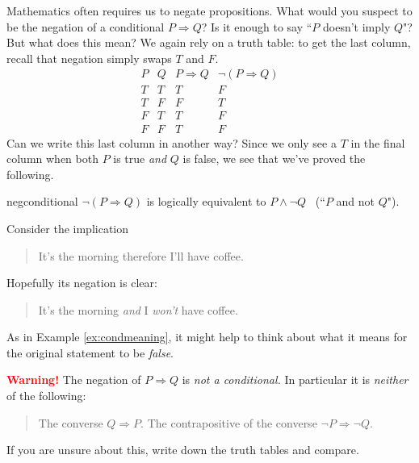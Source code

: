  

Mathematics often requires us to negate propositions. What would you suspect to be the negation of a conditional $P\Longrightarrow Q$? Is it enough to say ``$P$ doesn't imply $Q$"? But what does this mean? We again rely on a truth table: to get the last column, recall that negation simply swaps $T$ and $F$.
\[
	\begin{array}{cc|c|c}
		P & Q & P\Longrightarrow Q & \neg(P\Longrightarrow Q)\\\hline
		T & T & T & F\\
		T & F & F & T\\
		F & T & T & F\\
		F & F & T & F
	\end{array}
\]
Can we write this last column in another way? Since we only see a $T$ in the final column when both $P$ is true \emph{and} $Q$ is false, we see that we've proved the following.

\begin{thm}{}{negconditional}
	$\neg(P\Longrightarrow Q)$ is logically equivalent to $P\wedge\neg Q$ \ (``$P$ and not $Q$").
\end{thm}


\begin{example}{}{}
	Consider the implication
	\begin{quote}
	  It's the morning therefore I'll have coffee.
	\end{quote}
	Hopefully its negation is clear:
	\begin{quote}
	  It's the morning \emph{and} I \emph{won't} have coffee.
	\end{quote}
	As in Example \ref{ex:condmeaning}, it might help to think about what it means for the original statement to be \emph{false}.
\end{example}

\begin{tcolorbox}
{\bf \textcolor{red}{Warning!}} The negation of $P\Longrightarrow Q$ is \emph{not a conditional.} In particular it is \emph{neither} of the following:
\begin{quote}
  The converse $Q\Longrightarrow P$.\smallbreak
  The contrapositive of the converse $\neg P\Longrightarrow\neg Q$. 
\end{quote}
If you are unsure about this, write down the truth tables and compare.
\end{tcolorbox}

\bigbreak



